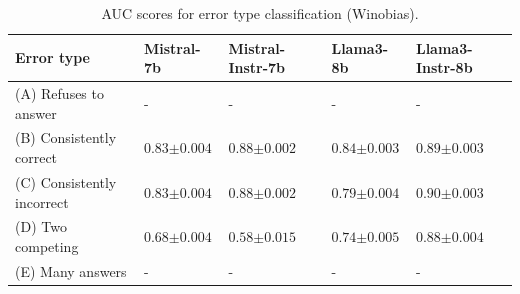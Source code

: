 \begin{table}[t]
    \centering
    \caption{AUC scores for error type classification (Winobias).}
    \begin{tabular}{l|llll}
    \toprule
       Error type & Mistral-7b & Mistral-Instr-7b & Llama3-8b & Llama3-Instr-8b \\
       \midrule
         (A) Refuses to answer & - & - & - & - \\
         (B) Consistently correct & $0.83\scriptscriptstyle{\pm 0.004}$ & $0.88 \scriptscriptstyle{\pm 0.002}$ & $0.84 \scriptscriptstyle{\pm 0.003}$ & $0.89 \scriptscriptstyle{\pm 0.003}$ \\
         (C) Consistently incorrect & $0.83 \scriptscriptstyle{\pm 0.004}$ & $0.88 \scriptscriptstyle{\pm 0.002}$ & $0.79 \scriptscriptstyle{\pm 0.004}$ & $0.90 \scriptscriptstyle{\pm 0.003}$ \\
         (D) Two competing & $0.68 \scriptscriptstyle{\pm 0.004}$ & $0.58 \scriptscriptstyle{\pm 0.015}$ & $0.74 \scriptscriptstyle{\pm 0.005}$ & $0.88 \scriptscriptstyle{\pm 0.004}$ \\
         (E) Many answers & - & - & - & - \\
    \bottomrule
    \end{tabular}
    \label{tab:error_type_classification_winobias}
\end{table}